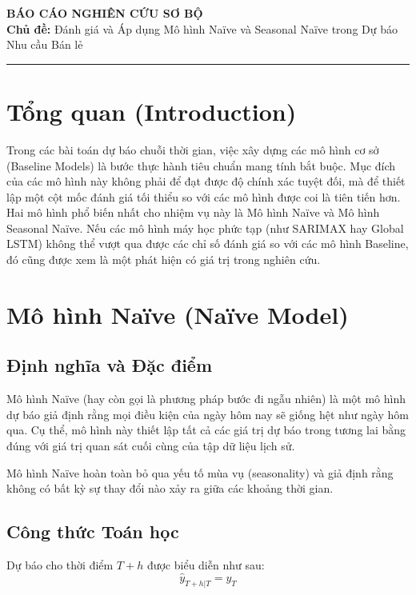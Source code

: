 \documentclass[12pt,a4paper]{article}
\begin{document}
    \begin{center}
        \LARGE\textbf{BÁO CÁO NGHIÊN CỨU SƠ BỘ}\\[1.5ex]
        \large\textbf{Chủ đề:} Đánh giá và Áp dụng Mô hình Naïve và Seasonal Naïve trong Dự báo Nhu cầu Bán lẻ
    \end{center}

    \vspace{0.5cm}
    \hrule
    \vspace{0.5cm}

    \section{Tổng quan (Introduction)}
    Trong các bài toán dự báo chuỗi thời gian, việc xây dựng các mô hình cơ sở (Baseline Models) là bước thực hành tiêu chuẩn mang tính bắt buộc. Mục đích của các mô hình này không phải để đạt được độ chính xác tuyệt đối, mà để thiết lập một cột mốc đánh giá tối thiểu so với các mô hình được coi là tiên tiến hơn. Hai mô hình phổ biến nhất cho nhiệm vụ này là Mô hình Naïve và Mô hình Seasonal Naïve. Nếu các mô hình máy học phức tạp (như SARIMAX hay Global LSTM) không thể vượt qua được các chỉ số đánh giá so với các mô hình Baseline, đó cũng được xem là một phát hiện có giá trị trong nghiên cứu.

    \section{Mô hình Naïve (Naïve Model)}

    \subsection{Định nghĩa và Đặc điểm}
    Mô hình Naïve (hay còn gọi là phương pháp bước đi ngẫu nhiên) là một mô hình dự báo giả định rằng mọi điều kiện của ngày hôm nay sẽ giống hệt như ngày hôm qua. Cụ thể, mô hình này thiết lập tất cả các giá trị dự báo trong tương lai bằng đúng với giá trị quan sát cuối cùng của tập dữ liệu lịch sử.

    Mô hình Naïve hoàn toàn bỏ qua yếu tố mùa vụ (seasonality) và giả định rằng không có bất kỳ sự thay đổi nào xảy ra giữa các khoảng thời gian.

    \subsection{Công thức Toán học}
    Dự báo cho thời điểm $T+h$ được biểu diễn như sau:
    \[ \hat{y}_{T+h|T} = y_T \]
\end{document}
